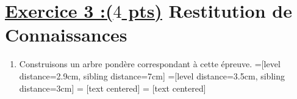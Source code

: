 \documentclass[12pt,a4paper]{article}
\begin{document}
\section*{\underline{Exercice 3 :($4$ pts)} Restitution de Connaissances}
\begin{enumerate}
    \item Construisons un arbre pondère correspondant à cette épreuve.
=[level distance=2.9cm, sibling distance=7cm] %
=[level distance=3.5cm, sibling distance=3cm] %
 = [text centered] %
 = [text centered] %

\begin{tikzpicture}[grow=right, sloped] %


\end{tikzpicture}
\end{enumerate}
\end{document}
